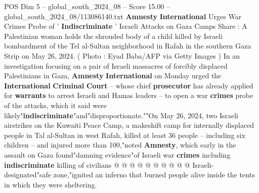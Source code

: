 \begin{textsample}{POS Dim 5 – global\_south\_2024\_08 – Score 15.00 – global\_south\_2024\_08/113086140.txt}  \label{ex:f5_pos_323}
\textbf{Amnesty} \textbf{International} Urges War Crimes Probe of ' \textbf{Indiscriminate} ' Israeli Attacks on Gaza Camps Share : A Palestinian woman holds the shrouded body of a child killed by Israeli bombardment of the Tel al-Sultan neighborhood in Rafah in the southern Gaza Strip on May 26, 2024. ( Photo : Eyad Baba/AFP via Getty Images ) In an investigation focusing on a pair of Israeli massacres of forcibly displaced Palestinians in Gaza, \textbf{Amnesty} \textbf{International} on Monday urged the \textbf{International} \textbf{Criminal} \textbf{Court} -- whose chief \textbf{prosecutor} has already applied for \textbf{warrants} to arrest Israeli and Hamas leaders -- to open a war \textbf{crimes} probe of the attacks, which it said were likely"\textbf{indiscriminate}"and"disproportionate.""On May 26, 2024, two Israeli airstrikes on the Kuwaiti Peace Camp, a makeshift camp for internally displaced people in Tal al-Sultan in west Rafah, killed at least 36 people -- including six children -- and injured more than 100,"noted \textbf{Amnesty}, which early in the assault on Gaza found"damning evidence"of Israeli war \textbf{crimes} including \textbf{indiscriminate} killing of civilians @ @ @ @ @ @ @ @ @ @ Israeli-designated"safe zone,"ignited an inferno that burned people alive inside the tents in which they were sheltering.

\end{textsample}
